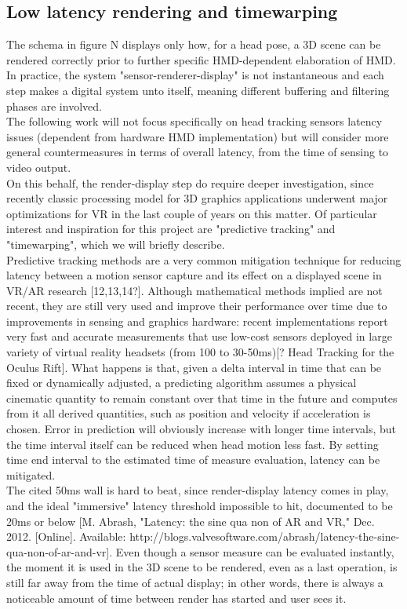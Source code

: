 \subsection{Low latency rendering and timewarping}
The schema in figure N displays only how, for a head pose, a 3D scene can be rendered correctly prior to further specific HMD-dependent elaboration of HMD. In practice, the system "sensor-renderer-display" is not instantaneous and each step makes a digital system unto itself, meaning different buffering and filtering phases are involved.\\
The following work will not focus specifically on head tracking sensors latency issues (dependent from hardware HMD implementation) but will consider more general countermeasures in terms of overall latency, from the time of sensing to video output.\\
On this behalf, the render-display step do require deeper investigation, since recently classic processing model for 3D graphics applications underwent major optimizations for VR in the last couple of years on this matter. Of particular interest and inspiration for this project are "predictive tracking" and "timewarping", which we will briefly describe.\\
Predictive tracking methods are a very common mitigation technique for reducing latency between a motion sensor capture and its effect on a displayed scene in VR/AR research [12,13,14?]. Although mathematical methods implied are not recent, they are still very used and improve their performance over time due to improvements in sensing and graphics hardware: recent implementations report very fast and accurate measurements that use low-cost sensors deployed in large variety of virtual reality headsets (from 100 to 30-50ms)[? Head Tracking for the Oculus Rift]. What happens is that, given a delta interval in time that can be fixed or dynamically adjusted, a predicting algorithm assumes a physical cinematic quantity to remain constant over that time in the future and computes from it all derived quantities, such as position and velocity if acceleration is chosen. Error in prediction will obviously increase with longer time intervals, but the time interval itself can be reduced when head motion less fast. By setting time end interval to the estimated time of measure evaluation, latency can be mitigated.\\
The cited 50ms wall is hard to beat, since render-display latency comes in play, and the ideal "immersive" latency threshold impossible to hit, documented to be 20ms or below [M. Abrash, "Latency: the sine qua non of AR and VR," Dec. 2012. [Online]. Available: http://blogs.valvesoftware.com/abrash/latency-the-sine-qua-non-of-ar-and-vr]. Even though a sensor measure can be evaluated instantly, the moment it is used in the 3D scene to be rendered, even as a last operation, is still far away from the time of actual display; in other words, there is always a noticeable amount of time between render has started and user sees it.

